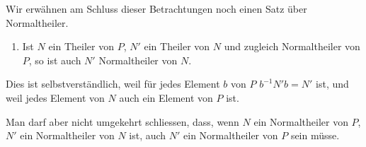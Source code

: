 \documentclass[11pt]{article}
\begin{document}
Wir erwähnen am Schluss dieser Betrachtungen noch einen Satz über Normaltheiler.
\begin{enumerate}[resume,label=\arabic*.]
\item Ist $N$ ein Theiler von $P$, $N'$ ein Theiler von $N$ und zugleich Normaltheiler von $P$, so ist auch $N'$ Normaltheiler von $N$.
\end{enumerate}
Dies ist selbstverständlich, weil für jedes Element $b$ von $P$ $b^{-1}N'b=N'$ ist, und weil jedes Element von $N$ auch ein Element von $P$ ist.

Man darf aber nicht umgekehrt schliessen, dass, wenn $N$ ein Normaltheiler von $P$, $N'$ ein Normaltheiler von $N$ ist, auch $N'$ ein Normaltheiler von $P$ sein müsse.
\end{document}
